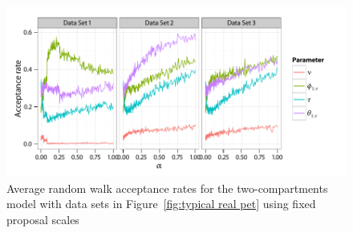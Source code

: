 \begin{figure}[t]
  \UseAltLinespread
  \includegraphics[width=\linewidth]{fig_src/Fixed_Proposal}
  \caption[Acceptance rates of non-adaptive \protect\smc algorithms]
  {Average random walk acceptance rates for the two-compartments \pet model
    with data sets in Figure~\ref{fig:typical real pet} using fixed proposal
    scales}
  \label{fig:pet fixed proposal}
\end{figure}
